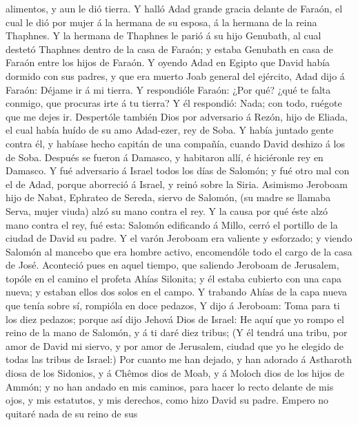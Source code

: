 alimentos, y aun le dió tierra.  Y halló Adad grande gracia
delante de Faraón, el cual le dió por mujer á la hermana de su esposa, á
la hermana de la reina Thaphnes.  Y la hermana de Thaphnes
le parió á su hijo Genubath, al cual destetó Thaphnes dentro de la casa
de Faraón; y estaba Genubath en casa de Faraón entre los hijos de
Faraón.  Y oyendo Adad en Egipto que David había dormido
con sus padres, y que era muerto Joab general del ejército, Adad dijo á
Faraón: Déjame ir á mi tierra.  Y respondióle Faraón: ¿Por
qué? ¿qué te falta conmigo, que procuras irte á tu tierra? Y él
respondió: Nada; con todo, ruégote que me dejes ir. 
Despertóle también Dios por adversario á Rezón, hijo de Eliada, el cual
había huído de su amo Adad-ezer, rey de Soba.  Y había
juntado gente contra él, y habíase hecho capitán de una compañía, cuando
David deshizo á los de Soba. Después se fueron á Damasco, y habitaron
allí, é hiciéronle rey en Damasco.  Y fué adversario á
Israel todos los días de Salomón; y fué otro mal con el de Adad, porque
aborreció á Israel, y reinó sobre la Siria.  Asimismo
Jeroboam hijo de Nabat, Ephrateo de Sereda, siervo de Salomón, (su madre
se llamaba Serva, mujer viuda) alzó su mano contra el rey. 
Y la causa por qué éste alzó mano contra el rey, fué esta: Salomón
edificando á Millo, cerró el portillo de la ciudad de David su padre.
 Y el varón Jeroboam era valiente y esforzado; y viendo
Salomón al mancebo que era hombre activo, encomendóle todo el cargo de
la casa de José.  Aconteció pues en aquel tiempo, que
saliendo Jeroboam de Jerusalem, topóle en el camino el profeta Ahías
Silonita; y él estaba cubierto con una capa nueva; y estaban ellos dos
solos en el campo.  Y trabando Ahías de la capa nueva que
tenía sobre sí, rompióla en doce pedazos,  Y dijo á
Jeroboam: Toma para ti los diez pedazos; porque así dijo Jehová Dios de
Israel: He aquí que yo rompo el reino de la mano de Salomón, y á ti daré
diez tribus;  (Y él tendrá una tribu, por amor de David mi
siervo, y por amor de Jerusalem, ciudad que yo he elegido de todas las
tribus de Israel:)  Por cuanto me han dejado, y han adorado
á Astharoth diosa de los Sidonios, y á Chêmos dios de Moab, y á Moloch
dios de los hijos de Ammón; y no han andado en mis caminos, para hacer
lo recto delante de mis ojos, y mis estatutos, y mis derechos, como hizo
David su padre.  Empero no quitaré nada de su reino de sus

